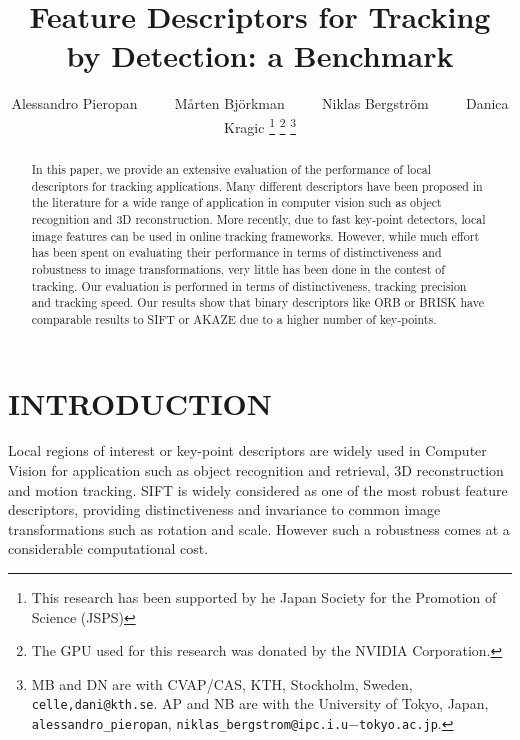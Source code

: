 \documentclass[letterpaper, 10pt, conference]{ieeeconf}
\title{\LARGE \bf Feature Descriptors for Tracking by Detection: a Benchmark}
\author{Alessandro Pieropan ~~~~ Mårten Bj{\"o}rkman  ~~~~ Niklas Bergstr{\"o}m ~~~~ Danica Kragic%
\thanks{This research has been supported by he Japan Society for the Promotion of Science (JSPS)}
\thanks{The GPU used for this research was donated by the NVIDIA Corporation.}
\thanks{MB and DN are with CVAP/CAS, KTH, Stockholm, Sweden, {\tt celle,dani@kth.se}. AP and NB are with the University of Tokyo, Japan, {\tt alessandro\_pieropan}, {\tt niklas\_bergstrom@ipc.i.u$-$tokyo.ac.jp}.}}
\begin{document}
                                                                
                                                                                
\maketitle                                                                      
\thispagestyle{empty}                                                           
\pagestyle{empty}



\begin{abstract}
In this paper, we provide an extensive evaluation of the performance of local descriptors for tracking applications.
Many different descriptors have been proposed in the literature for a wide range of application in computer vision such as object recognition and 3D reconstruction. More recently, due to fast key-point detectors, local image features can be used in online tracking frameworks. However, while much effort has been spent on evaluating their performance in terms of distinctiveness and robustness to image transformations, very little has been done in the contest of tracking. Our evaluation is performed in terms of distinctiveness, tracking precision and tracking speed. Our results show that binary descriptors like ORB or BRISK have comparable results to SIFT or AKAZE due to a higher number of key-points.    

\end{abstract}

\section{INTRODUCTION}
\label{sec:introduction}



Local regions of interest or key-point descriptors are widely used in Computer Vision for application such as object recognition and retrieval, 3D reconstruction and motion tracking. SIFT \cite{lowe04} is widely considered as one of the most robust feature descriptors, providing distinctiveness and invariance to common image transformations such as rotation and scale. However such a robustness comes at a considerable computational cost. 
\end{document}
